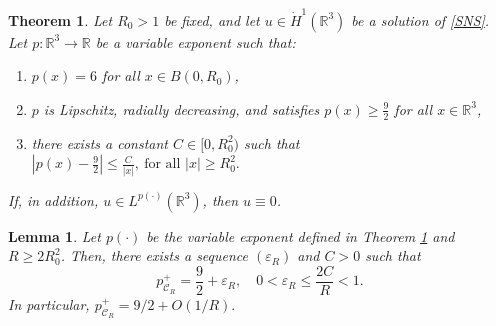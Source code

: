 \documentclass[10pt,a4paper]{amsart}
\newtheorem{theorem}{Theorem}
\newtheorem{lemma}{Lemma}
\begin{document}
\begin{theorem}\label{thm:over92}
Let $R_0 > 1$ be fixed, and let $u \in \dot{H}^1(\mathbb{R}^3)$ be a solution of \eqref{SNS}. Let $p:\mathbb{R}^3 \to \mathbb{R}$ be a variable exponent such that:
\begin{enumerate}
\item $p(x) = 6$ for all $x \in B(0,R_0)$,
\item $p$ is 
Lipschitz,  
 radially decreasing, and satisfies $p(x) \ge \frac{9}{2}$ for all $x \in \mathbb{R}^3$,
\item there exists a constant $C \in [0, R_0^2)$ such that
$
|p(x) - \tfrac{9}{2}| \le \frac{C}{|x|}, \  \text{for all } |x| \ge R_0^2.
$
\end{enumerate}
If, in addition, $u \in L^{p(\cdot)}(\mathbb{R}^3)$, then $u \equiv 0$.
\end{theorem}

\begin{lemma}\label{lem:PCsup_asymptotics}
Let $p(\cdot)$ be the variable exponent defined in Theorem \ref{thm:over92} and $R\geq 2R_0^2$. 
Then, 
there exists a sequence $(\varepsilon_R)$ and $C>0$ such that
\[
p_{\mathcal{C}_R}^+ = \frac{9}{2} + \varepsilon_R, 
\quad 0<\varepsilon_R \le \frac{2C}{R}<1.
\]
In particular,
$\label{O1R}
p_{\mathcal{C}_R}^+ =  {9}/ {2} + O\!\left( {1} / {R}\right).
$
\end{lemma}
\end{document}
